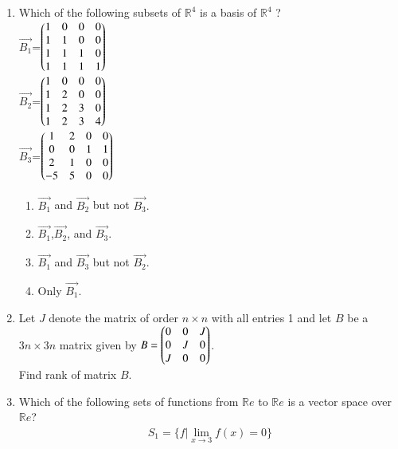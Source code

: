 \begin{enumerate}[label=\thesection.\arabic*.,ref=\thesection.\theenumi]
\begin{enumerate}
    \item {}
    \item {}
    \item {}
    \item {}
\end{enumerate}
%
\solution

\item Which of the following subsets of $\mathbb{R}^4$ is a basis of $\mathbb{R}^4$ ?\\
$\vec{B_1}$=$\begin{pmatrix}1&0&0&0\\1&1&0&0\\1&1&1&0\\1&1&1&1\end{pmatrix}$
\\
$\vec{B_2}$=$\begin{pmatrix}1&0&0&0\\1&2&0&0\\1&2&3&0\\1&2&3&4\end{pmatrix}$
\\
$\vec{B_3}$=$\begin{pmatrix}1&2&0&0\\0&0&1&1\\2&1&0&0\\-5&5&0&0\end{pmatrix}$
\begin{enumerate}
\item $\vec{B_1}$ and $\vec{B_2}$ but not $\vec{B_3}.$ 
\item $\vec{B_1}$,$\vec{B_2}$, and $\vec{B_3}.$
\item $\vec{B_1}$ and $\vec{B_3}$ but not $\vec{B_2}.$
\item Only $\vec{B_1}.$ 
\end{enumerate}
%
\solution

%
\item Let $J$ denote the matrix of order $n \times n$ with all
entries 1 and let $B$ be a $3n \times 3n$ matrix given by
$B = \begin{pmatrix}0&0&J\\0&J&0\\J&0&0\end{pmatrix}$. \\
Find rank of matrix $B$.
%
\solution

\item Which of the following sets of functions from $\mathbb{R}e$ to $\mathbb{R}e$ is a vector space over $\mathbb{R}e$?
\begin{align}
S_1 = \{f|\lim_{x\to3} f(x) = 0\}\\

\end{align}
\end{enumerate}
